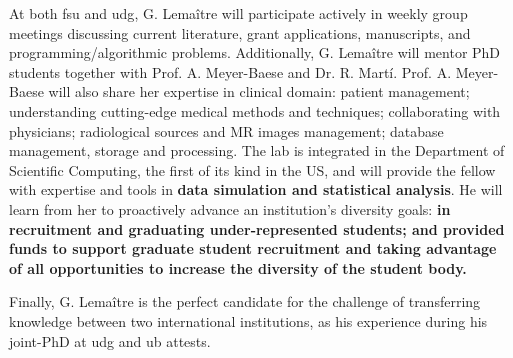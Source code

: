 At both \ac{fsu} and \ac{udg}, G. Lema\^itre will participate actively in weekly group meetings discussing current literature, grant applications, manuscripts, and programming/algorithmic problems.
Additionally, G. Lema\^itre will mentor PhD students together with Prof. A. Meyer-Baese and Dr. R. Mart\'i.
Prof. A. Meyer-Baese will also share her expertise in clinical domain: patient management; understanding cutting-edge medical methods and techniques; collaborating with physicians; radiological sources and MR images management; database management, storage and processing.
The lab is integrated in the Department of Scientific Computing, the first of its kind in the US, and will provide the fellow with expertise and tools in \textbf{data simulation and statistical analysis}.
He will learn from her to proactively advance an institution's diversity goals: \textbf{in recruitment and graduating under-represented students; and provided funds to support graduate student recruitment and taking advantage of all opportunities to increase the diversity of the student body.}

Finally, G. Lema\^itre is the perfect candidate for the challenge of transferring knowledge between two international institutions, as his experience during his joint-PhD at \ac{udg} and \ac{ub} attests.






